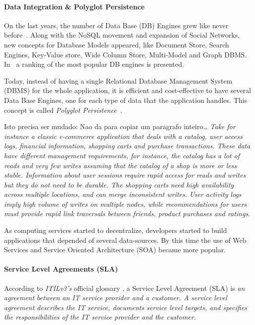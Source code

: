 \documentclass{article}
\begin{document}
\paragraph*{Data Integration \& Polyglot Persistence}
On the last years, the number of Data Base (DB) Engines grew like never before~\cite{PrecisaJustificarFrasesComoEsta}. 
Along with the NoSQL movement and expansion of Social Networks, new concepts for Database Models appeared, like Document Store, Search Engines, Key-Value store, Wide Column Store, Multi-Model and Graph DBMS. 
In~\cite{dbranking} a ranking of the most popular DB engines is presented.

Today, instead of having a single Relational Database Management System (DBMS) for the whole application, it is efficient and cost-effective to have several Data Base Engines, one for each type of data that the application handles. 
This concept is called \textit{Polyglot Persistence}~\cite{PP}.

{\sc Isto precisa ser mudado: Nao da para copiar um paragrafo inteiro\dots}
\textit{Take for instance a classic e-commerce application that deals with a catalog, user access logs, financial information, shopping carts and purchase transactions. These data have different management requirements, for instance, the catalog has a lot of reads and very few writes assuming that the catalog of a shop is more or less stable. Information about user sessions require rapid access for reads and writes but they do not need to be durable. The shopping carts need high availability across multiple locations, and can merge inconsistent writes. User activity logs imply high volume of writes on multiple nodes, while recommendations for users must provide rapid link traversals between friends, product purchases and ratings.} \cite{AdressingDataManagementCloud}

As computing services started to decentralize, developers started to build applications that depended of several data-sources. 
By this time the use of Web Services and Service Oriented Architecture (SOA) became more popular. 



\paragraph*{Service Level Agreements (SLA)}
According to \textit{ITILv3's} official glossary \cite{itilv3glossary}, a Service Level Agreement (SLA) is \textit{an agreement between an IT service provider and a customer.  A service level agreement describes the IT service, documents service level targets, and specifies the responsibilities of the IT service provider and the customer.} 
\end{document}
